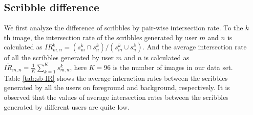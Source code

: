 \documentclass[runningheads,a4paper]{llncs}
\begin{document}
\subsection{Scribble difference}

We first analyze the difference of scribbles by pair-wise intersection rate. To the $k$th image, the intersection rate of the scribbles generated by user $m$ and $n$ is calculated as $IR^{k}_{m,n}=(s^{k}_{m}\cap s^{k}_{n})/(s^{k}_{m}\cup s^{k}_{n})$. And the average intersection rate of all the scribbles generated by user $m$ and $n$ is calculated as $\bar{IR}_{m,n}=\frac{1}{K}\sum^{K}_{k=1}{s^{k}_{m,n}}$, here $K=96$ is the number of images in our data set. Table \ref{tab:sb-IR} shows the average interaction rates between the scribbles generated by all the users on foreground and background, respectively. It is observed that the values of average intersection rates between the scribbles generated by different users are quite low.


\end{document}
